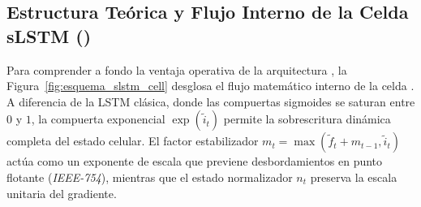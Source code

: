 \subsection{Estructura Teórica y Flujo Interno de la Celda sLSTM (\xlstm{})}

Para comprender a fondo la ventaja operativa de la arquitectura \xlstm{}, la Figura~\ref{fig:esquema_slstm_cell} desglosa el flujo matemático interno de la celda \slstm{}. A diferencia de la LSTM clásica, donde las compuertas sigmoides se saturan entre $0$ y $1$, la compuerta exponencial $\exp(\tilde{i}_t)$ permite la sobrescritura dinámica completa del estado celular. El factor estabilizador $m_t = \max(\tilde{f}_t + m_{t-1}, \tilde{i}_t)$ actúa como un exponente de escala que previene desbordamientos en punto flotante (\textit{IEEE-754}), mientras que el estado normalizador $n_t$ preserva la escala unitaria del gradiente.

